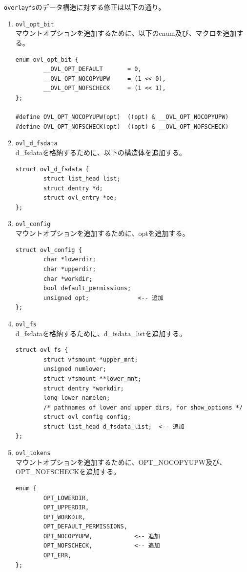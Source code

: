 \documentclass[twoside,11pt,fleqn]{book}
\begin{document}
\texttt{overlayfs}のデータ構造に対する修正は以下の通り。
\begin{enumerate}
\item \texttt{ovl\_opt\_bit}\\
マウントオプションを追加するために、以下のenum及び、マクロを追加する。
\footnotesize
\begin{verbatim}
enum ovl_opt_bit {
        __OVL_OPT_DEFAULT       = 0,
        __OVL_OPT_NOCOPYUPW     = (1 << 0),
        __OVL_OPT_NOFSCHECK     = (1 << 1),
};

#define OVL_OPT_NOCOPYUPW(opt)  ((opt) & __OVL_OPT_NOCOPYUPW)
#define OVL_OPT_NOFSCHECK(opt)  ((opt) & __OVL_OPT_NOFSCHECK)
\end{verbatim}
\normalsize

\item \texttt{ovl\_d\_fsdata}\\
d\_fsdataを格納するために、以下の構造体を追加する。
\footnotesize
\begin{verbatim}
struct ovl_d_fsdata {
        struct list_head list;
        struct dentry *d;
        struct ovl_entry *oe;
};
\end{verbatim}
\normalsize

\item \texttt{ovl\_config}\\
マウントオプションを追加するために、optを追加する。
\footnotesize
\begin{verbatim}
struct ovl_config {
        char *lowerdir;
        char *upperdir;
        char *workdir;
        bool default_permissions;
        unsigned opt;              <-- 追加
};
\end{verbatim}
\normalsize

\item \texttt{ovl\_fs}\\
d\_fsdataを格納するために、d\_fsdata\_listを追加する。
\footnotesize
\begin{verbatim}
struct ovl_fs {
        struct vfsmount *upper_mnt;
        unsigned numlower;
        struct vfsmount **lower_mnt;
        struct dentry *workdir;
        long lower_namelen;
        /* pathnames of lower and upper dirs, for show_options */
        struct ovl_config config;
        struct list_head d_fsdata_list;  <-- 追加
};
\end{verbatim}
\normalsize

\item \texttt{ovl\_tokens}\\
マウントオプションを追加するために、OPT\_NOCOPYUPW及び、OPT\_NOFSCHECKを追加する。
\footnotesize
\begin{verbatim}
enum {
        OPT_LOWERDIR,
        OPT_UPPERDIR,
        OPT_WORKDIR,
        OPT_DEFAULT_PERMISSIONS,
        OPT_NOCOPYUPW,            <-- 追加
        OPT_NOFSCHECK,            <-- 追加
        OPT_ERR,
};


\end{verbatim}
\end{enumerate}
\end{document}
